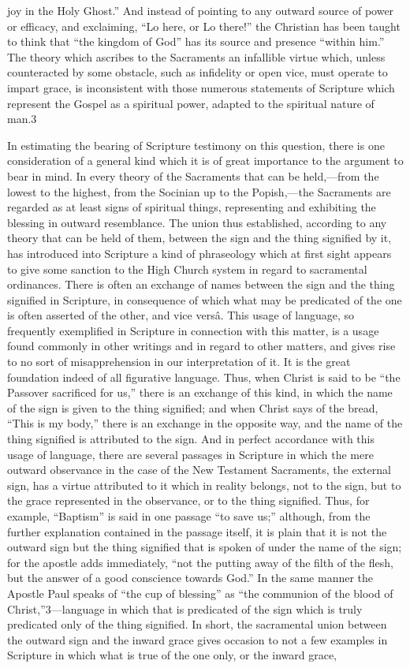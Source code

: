 \documentclass[]{book}
\begin{document}
joy in the Holy Ghost.'' And instead of pointing to any outward source of power or efficacy, and exclaiming, ``Lo here, or Lo there!'' the Christian has been taught to think that ``the kingdom of God'' has its source and presence ``within him.'' The theory which ascribes to the Sacraments an infallible virtue which, unless counteracted by some obstacle, such as infidelity or open vice, must operate to impart grace, is inconsistent with those numerous statements of Scripture which represent the Gospel as a spiritual power, adapted to the spiritual nature of man.3

In estimating the bearing of Scripture testimony on this question, there is one consideration of a general kind which it is of great importance to the argument to bear in mind. In every theory of the Sacraments that can be held,---from the lowest to the highest, from the Socinian up to the Popish,---the Sacraments are regarded as at least signs of spiritual things, representing and exhibiting the blessing in outward resemblance. The union thus established, according to any theory that can be held of them, between the sign and the thing signified by it, has introduced into Scripture a kind of phraseology which at first sight appears to give some sanction to the High Church system in regard to sacramental ordinances. There is often an exchange of names between the sign and the thing signified in Scripture, in consequence of which what may be predicated of the one is often asserted of the other, and vice versâ. This usage of language, so frequently exemplified in Scripture in connection with this matter, is a usage found commonly in other writings and in regard to other matters, and gives rise to no sort of misapprehension in our interpretation of it. It is the great foundation indeed of all figurative language. Thus, when Christ is said to be ``the Passover sacrificed for us,'' there is an exchange of this kind, in which the name of the sign is given to the thing signified; and when Christ says of the bread, ``This is my body,'' there is an exchange in the opposite way, and the name of the thing signified is attributed to the sign. And in perfect accordance with this usage of language, there are several passages in Scripture in which the mere outward observance in the case of the New Testament Sacraments, the external sign, has a virtue attributed to it which in reality belongs, not to the sign, but to the grace represented in the observance, or to the thing signified. Thus, for example, ``Baptism'' is said in one passage ``to save us;'' although, from the further explanation contained in the passage itself, it is plain that it is not the outward sign but the thing signified that is spoken of under the name of the sign; for the apostle adds immediately, ``not the putting away of the filth of the flesh, but the answer of a good conscience towards God.'' In the same manner the Apostle Paul speaks of ``the cup of blessing'' as ``the communion of the blood of Christ,''3---language in which that is predicated of the sign which is truly predicated only of the thing signified. In short, the sacramental union between the outward sign and the inward grace gives occasion to not a few examples in Scripture in which what is true of the one only, or the inward grace, 
\end{document}
